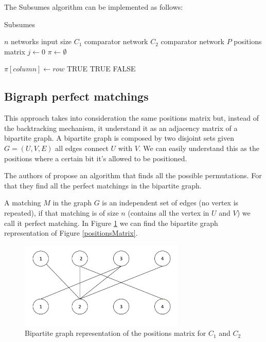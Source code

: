 \documentclass[../main.tex]{subfiles}
\begin{document}
	\newpage
	The Subsumes algorithm can be implemented as follows:
	
	\begin{algorithm}[H]
		\caption {Subsumes}
		\begin{algorithmic}
			\State $n$ networks input size
			\State $C_1$ comparator network
			\State $C_2$ comparator network
			\State $P$ positions matrix
			\State $j \leftarrow 0$
			\State $\pi \leftarrow \emptyset $ 
			
			\State $\pi[column] \leftarrow row $
			\Return TRUE
			\EndIf
			\EndIf
			\EndFor
			\Return TRUE
			\Else {}
			\Return FALSE
			\EndIf
			\EndProcedure
		\end{algorithmic}
	\end{algorithm}

	\subsection{Bigraph perfect matchings}
	This approach takes into consideration the same positions matrix but, instead of the backtracking mechanism, it understand it as an adjacency matrix of a bipartite graph. A bipartite graph is composed by two disjoint sets given $G=(U,V,E)$ all edges connect $U$ with $V$. We can easily understand this as the positions where a certain bit it's allowed to be positioned.
	
	The authors of \cite{improvedSubsumption} propose an algorithm that finds all the possible permutations. For that they find all the perfect matchings in the bipartite graph. 
	
	A matching $M$ in the graph $G$ is an independent set of edges (no vertex is repeated), if that matching is of size $n$ (contains all the vertex in $U$ and $V$) we call it perfect matching. In Figure \ref{bipartite} we can find the bipartite graph representation of Figure \ref{positionsMatrix}.
	
	\begin{figure}[H]
		\begin{center}
			\includegraphics[width=0.7\textwidth]{images/bipartiteMatchings}
			\caption{Bipartite graph representation of the positions matrix for $C_1$ and $C_2$}
			\label{bipartite}
		\end{center}
	\end{figure}
\end{document}
